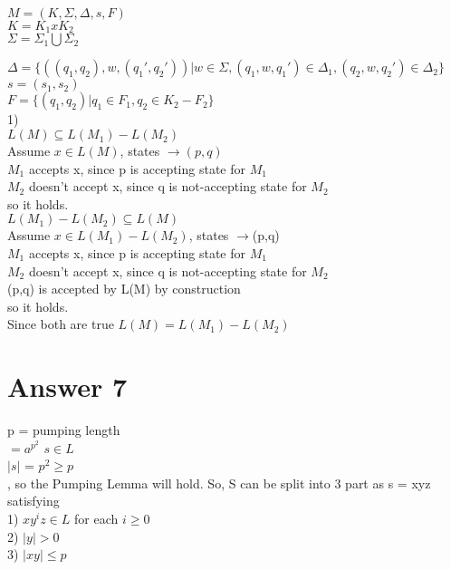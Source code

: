 \documentclass[12pt]{article}
\begin{document}
$M = (K,\Sigma,\Delta,s,F)$ \\

$ K = K_1 x K_2$ \\

$\Sigma  =\Sigma_1 \bigcup \Sigma_2$

$\Delta = \{((q_1,q_2),w,(q_1',q_2'))|w \in \Sigma, (q_1,w,q_1') \in \Delta_1, (q_2,w,q_2') \in \Delta_2\}$\\
$s = (s_1,s_2)$\\
$F = \{(q_1,q_2)|q_1 \in F_1,q_2 \in K_2-F_2\}$\\

1)\\

$L(M) \subseteq L(M_1) - L(M_2)$ \\

Assume $x\in L(M)$, states $\rightarrow (p,q)$\\

$M_1$ accepts x, since p is accepting state for $M_1$\\
$M_2$ doesn't accept x, since q is not-accepting state for $M_2$\\
so it holds. \\

$L(M_1)-L(M_2) \subseteq L(M)$\\


Assume $x\in L(M_1)-L(M_2)$, states $\rightarrow$(p,q)\\

$M_1$ accepts x, since p is accepting state for $M_1$\\
$M_2$ doesn't accept x, since q is not-accepting state for $M_2$\\
(p,q) is accepted by L(M) by construction \\
so it holds. \\

Since both are true $L(M) = L(M_1)-L(M_2)$ \\

\section*{Answer 7}

 p = pumping length\\

$ = a^{p^2}$ $s\in L$ \\

$|s|$ = $p^2 \geq p$\\, so the  Pumping Lemma will hold. So, S can be split into 3 part as s = xyz satisfying \\
1) $xy^{i}z \in L $ for each $i\geq0$\\
2) $|y|>0$\\
3) $|xy|\leq p$\\
\end{document}
